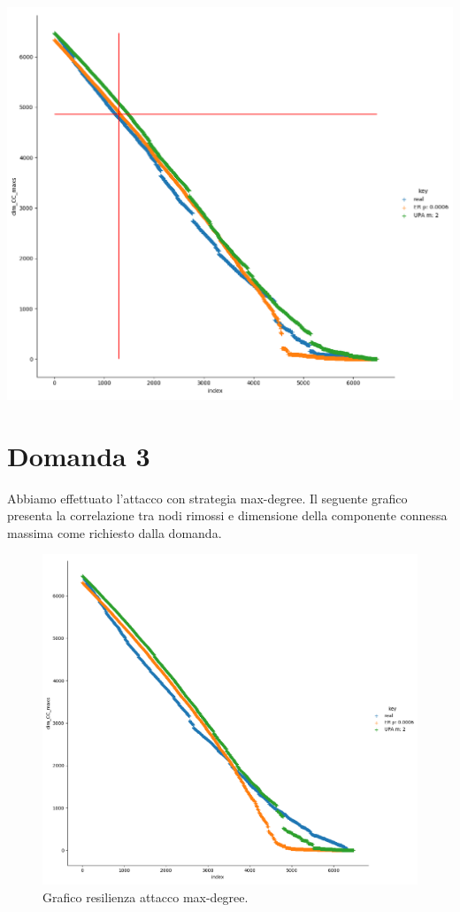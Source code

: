 \documentclass{article}
\begin{document}
\includegraphics[width=1.1\textwidth]{figures/figure_maxdree_line}

\newpage
	\section*{Domanda 3}
	Abbiamo effettuato l'attacco con strategia max-degree. Il seguente grafico presenta la correlazione tra nodi rimossi e dimensione della componente connessa massima come richiesto dalla domanda.
	\begin{figure}[h]
		\centering
		\includegraphics[width=1.25\textwidth]{figures/figure_random}
		\caption{Grafico resilienza attacco max-degree.}
	\end{figure}
\newpage
\end{document}
